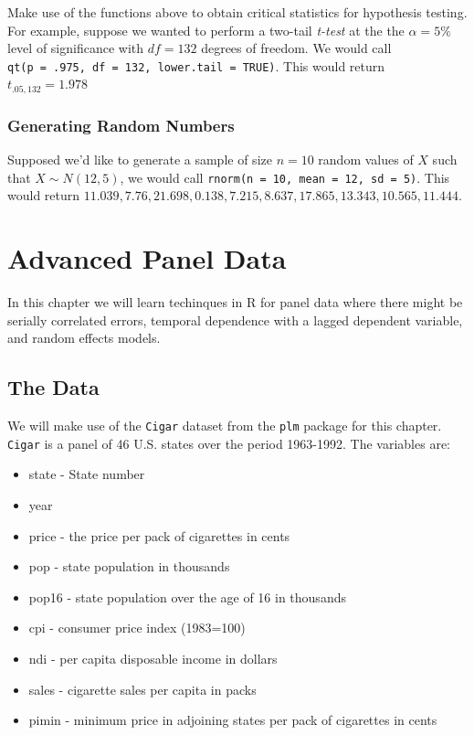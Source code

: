 \documentclass[]{book}
\providecommand{\tightlist}{%
  \setlength{\itemsep}{0pt}\setlength{\parskip}{0pt}}
\begin{document}
Make use of the functions above to obtain critical statistics for hypothesis testing. For example, suppose we wanted to perform a two-tail \emph{t-test} at the the \(\alpha=5\%\) level of significance with \(df = 132\) degrees of freedom. We would call \texttt{qt(p\ =\ .975,\ df\ =\ 132,\ lower.tail\ =\ TRUE)}. This would return \(t_{.05,132} = 1.978\)

\hypertarget{generating-random-numbers-1}{%
\subsection{Generating Random Numbers}\label{generating-random-numbers-1}}

Supposed we'd like to generate a sample of size \(n = 10\) random values of \(X\) such that \(X \sim N(12, 5)\), we would call \texttt{rnorm(n\ =\ 10,\ mean\ =\ 12,\ sd\ =\ 5)}. This would return \(11.039, 7.76, 21.698, 0.138, 7.215, 8.637, 17.865, 13.343, 10.565, 11.444\).

\hypertarget{chp15}{%
\chapter{Advanced Panel Data}\label{chp15}}

In this chapter we will learn techinques in R for panel data where there might be serially correlated errors, temporal dependence with a lagged dependent variable, and random effects models.

\hypertarget{the-data}{%
\section{The Data}\label{the-data}}

We will make use of the \texttt{Cigar} dataset from the \texttt{plm} package for this chapter. \texttt{Cigar} is a panel of 46 U.S. states over the period 1963-1992. The variables are:

\begin{itemize}
\tightlist
\item
  state - State number
\item
  year
\item
  price - the price per pack of cigarettes in cents
\item
  pop - state population in thousands
\item
  pop16 - state population over the age of 16 in thousands
\item
  cpi - consumer price index (1983=100)
\item
  ndi - per capita disposable income in dollars
\item
  sales - cigarette sales per capita in packs
\item
  pimin - minimum price in adjoining states per pack of cigarettes in cents
\end{itemize}
\end{document}
